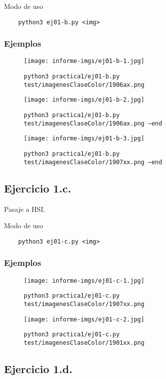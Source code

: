\documentclass[11pt, spanish]{article}
\begin{document}
Modo de uso
\begin{verbatim}
    python3 ej01-b.py <img>
\end{verbatim}

\subsubsection*{Ejemplos}
\begin{figure}[H]
\centering
  \texttt{[image: informe-imgs/ej01-b-1.jpg]}
  \caption{\texttt{python3 practica1/ej01-b.py test/imagenesClaseColor/1906ax.png}}
\end{figure}
\begin{figure}[H]
\centering
  \texttt{[image: informe-imgs/ej01-b-2.jpg]}
  \caption{\texttt{python3 practica1/ej01-b.py test/imagenesClaseColor/1906ax.png --end}}
\end{figure}

\begin{figure}[H]
\centering
  \texttt{[image: informe-imgs/ej01-b-3.jpg]}
  \caption{\texttt{python3 practica1/ej01-b.py test/imagenesClaseColor/1907xx.png --end}}
\end{figure}

\subsection{Ejercicio 1.c.}

Pasaje a HSI.

Modo de uso
\begin{verbatim}
    python3 ej01-c.py <img>
\end{verbatim}

\subsubsection*{Ejemplos}
\begin{figure}[H]
\centering
  \texttt{[image: informe-imgs/ej01-c-1.jpg]}
  \caption{\texttt{python3 practica1/ej01-c.py test/imagenesClaseColor/1907xx.png}}
\end{figure}
\begin{figure}[H]
\centering
  \texttt{[image: informe-imgs/ej01-c-2.jpg]}
  \caption{\texttt{python3 practica1/ej01-c.py test/imagenesClaseColor/1901xx.png}}
\end{figure}

\subsection{Ejercicio 1.d.}
\end{document}
